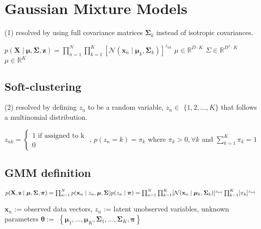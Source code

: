 
\section{Gaussian Mixture Models}



(1) resolved by using full covariance matrices $\boldsymbol{\Sigma}_{k}$ instead of isotropic covariances.

$p(\mathbf{X} \mid \boldsymbol{\mu}, \boldsymbol{\Sigma}, \mathbf{z})=\prod_{n=1}^{N} \prod_{k=1}^{K}\left[\mathcal{N}\left(\mathbf{x}_{n} \mid \boldsymbol{\mu}_{k}, \boldsymbol{\Sigma}_{k}\right)\right]^{z_{n k}}$
$\mu \in \mathbb{R}^{D\cdot K}$
$\Sigma \in \mathbb{R}^{D^2\cdot K}$
$\mu \in \mathbb{R}^{K}$

\subsection*{Soft-clustering}
(2) resolved by defining $z_{n}$ to be a random variable, $z_{n} \in$ $\{1,2, \ldots, K\}$ that follows a multinomial distribution.

$z_{nk}=\begin{cases}1\text{ if assigned to k}\\0\end{cases}$ , 
$p\left(z_{n}=k\right)=\pi_{k}$ where $\pi_{k}>0, \forall k$ and $\sum_{k=1}^{K} \pi_{k}=1$



\subsection*{GMM definition}

$
p(\mathbf{X}, \mathbf{z} \mid \boldsymbol{\mu}, \boldsymbol{\Sigma}, \boldsymbol{\pi}) 
= \prod_{n=1}^{N} p(\mathbf{x}_{n} \mid z_{n}, \boldsymbol{\mu}, \boldsymbol{\Sigma}) p(z_{n} \mid \boldsymbol{\pi}) 
\\= \prod_{n=1}^{N} \prod_{k=1}^{K}[\mathcal{N}(\mathbf{x}_{n} \mid \boldsymbol{\mu}_{k}, \boldsymbol{\Sigma}_{k})]^{z_{n k}} \prod_{k=1}^{K}[\pi_{k}]^{z_{n k}}
$


$\mathbf{x}_{n}$ := observed data vectors, $z_{n}$ := latent unobserved variables, unknown parameters $\boldsymbol{\theta}:=$ $\left\{\boldsymbol{\mu}_{1}, \ldots, \boldsymbol{\mu}_{K}, \boldsymbol{\Sigma}_{1}, \ldots, \boldsymbol{\Sigma}_{K}, \boldsymbol{\pi}\right\}$

